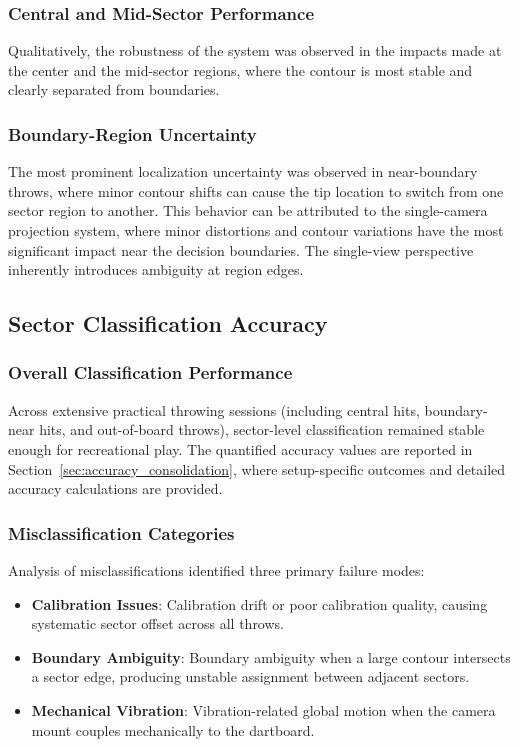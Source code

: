\subsubsection{Central and Mid-Sector Performance}
Qualitatively, the robustness of the system was observed in the impacts made at the center and the mid-sector regions, where the contour is most stable and clearly separated from boundaries.

\subsubsection{Boundary-Region Uncertainty}
The most prominent localization uncertainty was observed in near-boundary throws, where minor contour shifts can cause the tip location to switch from one sector region to another. This behavior can be attributed to the single-camera projection system, where minor distortions and contour variations have the most significant impact near the decision boundaries. The single-view perspective inherently introduces ambiguity at region edges.

\vspace{\baselineskip}

\subsection{Sector Classification Accuracy}

\subsubsection{Overall Classification Performance}
Across extensive practical throwing sessions (including central hits, boundary-near hits, and out-of-board throws), sector-level classification remained stable enough for recreational play. The quantified accuracy values are reported in Section~\ref{sec:accuracy_consolidation}, where setup-specific outcomes and detailed accuracy calculations are provided.

\subsubsection{Misclassification Categories}
Analysis of misclassifications identified three primary failure modes:

\begin{itemize}
	\item \textbf{Calibration Issues}: Calibration drift or poor calibration quality, causing systematic sector offset across all throws.
	\item \textbf{Boundary Ambiguity}: Boundary ambiguity when a large contour intersects a sector edge, producing unstable assignment between adjacent sectors.
	\item \textbf{Mechanical Vibration}: Vibration-related global motion when the camera mount couples mechanically to the dartboard.
\end{itemize}


